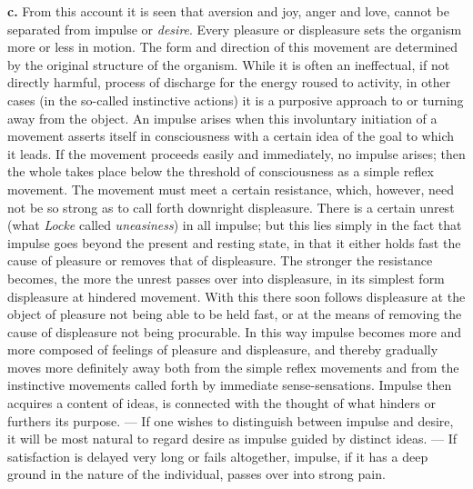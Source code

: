 \documentclass[12pt,a4paper]{book}
\newcommand{\opage}[1]{\marginnote{\footnotesize\textit{[#1]}}}
\begin{document}
\textbf{c.} From this account it is seen that aversion and joy, anger
and love, cannot be separated from impulse or \emph{desire}. Every
pleasure or displeasure sets the organism more or less in motion. The
form and direction of this movement are determined by the original
structure of the organism. While it is often an ineffectual, if not
directly harmful, process of discharge for the energy roused to
activity, in other cases (in the so-called instinctive actions) it is
a
\opage{284}purposive approach to or turning away from the object. An
impulse arises when this involuntary initiation of a movement asserts
itself in consciousness with a certain idea of the goal to which it
leads. If the movement proceeds easily and immediately, no impulse
arises; then the whole takes place below the threshold of consciousness
as a simple reflex movement. The movement must meet a certain
resistance, which, however, need not be so strong as to call forth
downright displeasure. There is a certain unrest (what \emph{Locke}
called \textit{uneasiness}) in all impulse; but this lies simply in the
fact that impulse goes beyond the present and resting state, in that it
either holds fast the cause of pleasure or removes that of displeasure.
The stronger the resistance becomes, the more the unrest passes over
into displeasure, in its simplest form displeasure at hindered movement.
With this there soon follows displeasure at the object of pleasure not
being able to be held fast, or at the means of removing the cause of
displeasure not being procurable. In this way impulse becomes more and
more composed of feelings of pleasure and displeasure, and thereby
gradually moves more definitely away both from the simple reflex
movements and from the instinctive movements called forth by immediate
sense-sensations. Impulse then acquires a content of ideas, is connected
with the thought of what hinders or furthers its purpose. --- If one
wishes to distinguish between impulse and desire, it will be most
natural to regard desire as impulse guided by distinct ideas. --- If
satisfaction is delayed very long or fails altogether, impulse, if it
has a deep ground in the nature of the individual, passes over into
strong pain.
\end{document}
